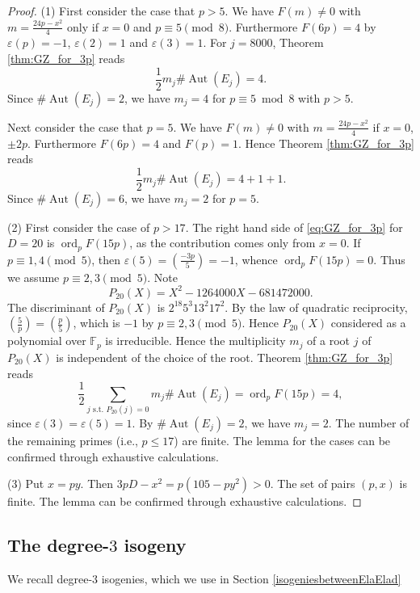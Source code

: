 \documentclass[a4paper, 11pt]{article}
\theoremstyle{plain}
\newcommand{\?}{\textcolor{red}{??}}
\newcommand{\ord}{{\operatorname{ord}}}
\newcommand{\Aut}{{\operatorname{Aut}}}
\begin{document}
\begin{proof}
(1) First consider the case that $p>5$.
We have $F(m) \ne 0$ with $m=\frac{24p-x^2}{4}$ only if $x=0$
and $p\equiv 5 \pmod 8$. Furthermore $F(6p) = 4$ by $\varepsilon(p)=-1$, $\varepsilon(2)=1$ and $\varepsilon(3)=1$. 
For $j=8000$, Theorem \ref{thm:GZ_for_3p} reads
\[
\frac{1}{2} m_j \# \Aut(E_j) = 4.
\]
Since $\# \Aut(E_j) = 2$,
we have $m_j = 4$ for $p\equiv 5 \bmod 8$ with $p > 5$.

Next consider the case that $p=5$.
We have $F(m)\ne 0$ with $m=\frac{24p-x^2}{4}$ if $x=0$, $\pm 2p$.
Furthermore $F(6p) = 4$ and $F(p) = 1$. Hence
Theorem \ref{thm:GZ_for_3p} reads
\[
\frac{1}{2} m_j \# \Aut(E_j) = 4+1+1.
\]
Since $\# \Aut(E_j) = 6$,
we have $m_j = 2$ for $p=5$.

(2) 
First consider the case of $p>17$.
The right hand side of \eqref{eq:GZ_for_3p} for $D=20$ is $\ord_p F(15p)$,
as the contribution comes only from $x=0$.
If $p \equiv 1,4 \pmod 5$, then $\varepsilon(5)=\left(\frac{-3p}{5}\right)=-1$,
whence $\ord_p F(15p)=0$. Thus we assume $p \equiv 2,3 \pmod 5$.
Note
\[
P_{20}(X)=X^2 - 1264000X - 681472000.
\]
The discriminant of $P_{20}(X)$ is $2^{18} 5^3 13^2 17^2$.
By the law of quadratic reciprocity, $\displaystyle \left(\frac{5}{p}\right) = \left(\frac{p}{5}\right)$, which is $-1$ by $p \equiv 2,3 \pmod 5$. Hence
$P_{20}(X)$ considered as a polynomial over ${\mathbb F}_p$ is irreducible. %
Hence the multiplicity $m_j$ of a root $j$ of $P_{20}(X)$ is independent of the choice of the root. Theorem \ref{thm:GZ_for_3p} reads
\[
\frac{1}{2} \sum_{j \text{ s.t. } P_{20}(j)=0} m_j \# \Aut(E_j) = \ord_p F(15p) = 4,
\]
since $\varepsilon(3)=\varepsilon(5)=1$. By $\# \Aut(E_j)=2$,
we have $m_j = 2$. The number of the remaining primes (i.e., $p\le 17$) are finite. The lemma for the cases can be confirmed through exhaustive calculations.

(3) Put $x=py$. Then $3pD-x^2 = p(105-py^2)>0$. The set of pairs $(p,x)$ is finite. The lemma
can be confirmed through exhaustive calculations.
\end{proof}



\subsection{The degree-$3$ isogeny}
We recall degree-$3$ isogenies, which we use in Section \ref{isogeniesbetweenElaElad}
\end{document}
